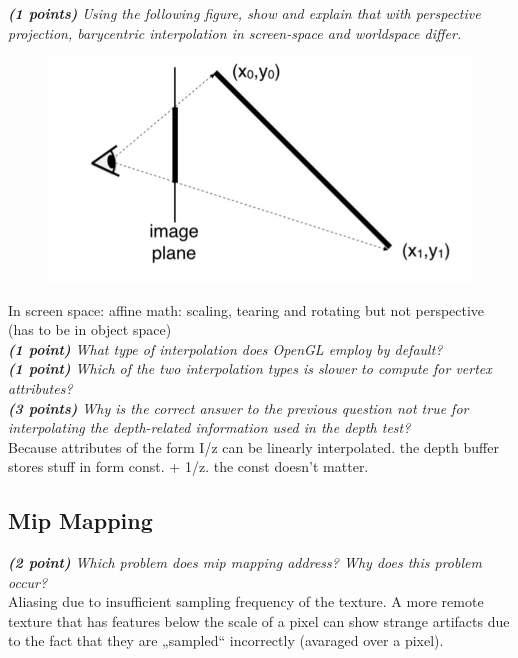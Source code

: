 \documentclass[a4paper,10pt]{article}
\begin{document}
\textit{\textbf{(1 points)} Using the following figure, show and explain that with perspective projection, barycentric interpolation in screen-space and worldspace differ.
}\\
\begin{figure}[H]
	\centering
	\includegraphics[width=.5\textwidth]{3-2-perspective}
\end{figure}

In screen space: affine math: scaling, tearing and rotating but not perspective (has to be in object space)\\


\textit{\textbf{(1 point)} What type of interpolation  does OpenGL employ by default?}\\


\textit{\textbf{(1 point)} Which of the two interpolation types is slower to compute for vertex attributes?}\\


\textit{\textbf{(3 points)} Why is the correct answer to the previous question not true for interpolating the depth-related information used in the depth test?}\\


Because attributes of the form I/z can be linearly interpolated. the depth buffer stores stuff in form const. + 1/z. the const doesn't matter.

\subsection{Mip Mapping}
\textit{\textbf{(2 point)} Which problem does mip mapping address? Why does this problem occur?}\\

Aliasing due to insufficient sampling frequency of the texture. A more remote texture
that has features below the scale of a pixel can show strange artifacts due to the fact that they are „sampled“ incorrectly (avaraged over a pixel). \\
\end{document}
